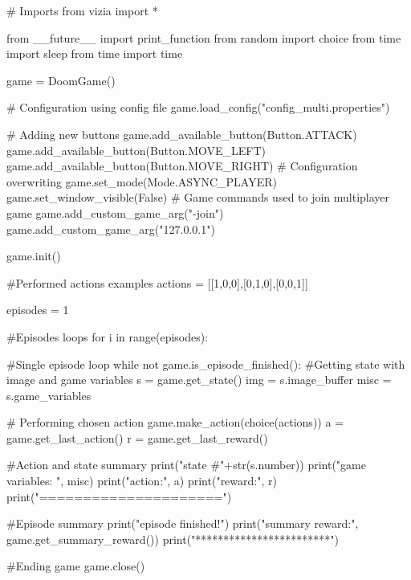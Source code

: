 \begin{pblock}
# Imports
from vizia import *

from __future__ import print_function
from random import choice
from time import sleep
from time import time

game = DoomGame()

# Configuration using config file
game.load_config("config_multi.properties")

# Adding new buttons
game.add_available_button(Button.ATTACK)
game.add_available_button(Button.MOVE_LEFT)
game.add_available_button(Button.MOVE_RIGHT)
# Configuration overwriting 
game.set_mode(Mode.ASYNC_PLAYER)
game.set_window_visible(False)
# Game commands used to join multiplayer game
game.add_custom_game_arg("-join")
game.add_custom_game_arg("127.0.0.1")

game.init()

#Performed actions examples
actions = [[1,0,0],[0,1,0],[0,0,1]]

episodes = 1

#Episodes loops
for i in range(episodes):
	
	#Single episode loop
	while not game.is_episode_finished():
		#Getting state with image and game variables			
		s = game.get_state()
		img = s.image_buffer
		misc = s.game_variables

		# Performing chosen action
		game.make_action(choice(actions))
		a = game.get_last_action()
		r = game.get_last_reward()
			
		#Action and state summary
		print("state #"+str(s.number))
		print("game variables: ", misc)
		print("action:", a)
		print("reward:", r)
		print("=====================")
	
	#Episode summary
	print("episode finished!")
	print("summary reward:", game.get_summary_reward())
	print("************************")

#Ending game
game.close()
\end{pblock}

